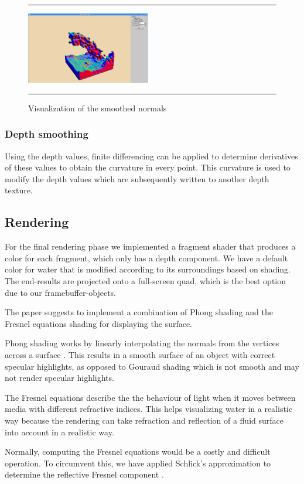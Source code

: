 \begin{figure}[!th]
\hrule
\begin{center}
\vspace*{2ex}\includegraphics[width=0.48\textwidth,clip=true,trim=10cm 1cm 10cm 3cm]{pictures/normals_smoothed.png}
\end{center}
\caption{Visualization of the smoothed normals}
\label{fig:normals} 
\vspace*{2ex}
\hrule
\end{figure}


\subsubsection{Depth smoothing}
Using the depth values, finite differencing can be applied to determine derivatives of these values to obtain the curvature in every point. 
This curvature is used to modify the depth values which are subsequently written to another depth texture.

\subsection{Rendering}
For the final rendering phase we implemented a fragment shader that produces a color for each fragment, which only has a depth component.
We have a default color for water that is modified according to its surroundings based on shading. 
The end-results are projected onto a full-screen quad, which is the best option due to our framebuffer-objects.

The paper suggests to implement a combination of Phong shading and the Fresnel equations shading for displaying the surface. 

Phong shading works by linearly interpolating the normals from the vertices across a surface \cite{phong1975illumination}. 
This results in a smooth surface of an object with correct specular highlights, as opposed to Gouraud shading which is not smooth and may not render specular highlights.

The Fresnel equations describe the the behaviour of light when it moves between media with different refractive indices. 
This helps visualizing water in a realistic way because the rendering can take refraction and reflection of a fluid surface into account in a realistic way.

Normally, computing the Fresnel equations would be a costly and difficult operation. To circumvent this, we have applied Schlick's approximation to determine the reflective Fresnel component \cite{schlick1994inexpensive}.

